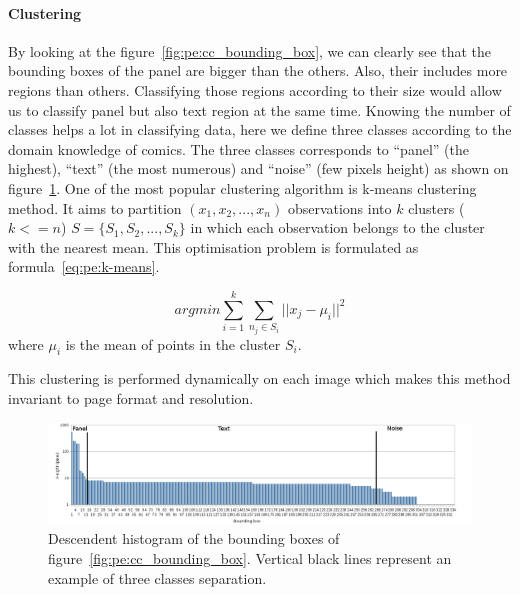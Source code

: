 \paragraph{Clustering} %
\label{par:clustering}
By looking at the figure~\ref{fig:pe:cc_bounding_box}, we can clearly see that the bounding boxes of the panel are bigger than the others.
Also, their includes more regions than others.
Classifying those regions according to their size would allow us to classify panel but also text region at the same time.
Knowing the number of classes helps a lot in classifying data, here 
we define three classes according to the domain knowledge of comics.
The three classes corresponds to ``panel'' (the highest), ``text'' (the most numerous) and ``noise'' (few pixels height) as shown on figure~\ref{fig:pe:histo_roi}.
One of the most popular clustering algorithm is k-means clustering method.
It aims to partition $(x_1, x_2, ...,x_n)$ observations into $k$ clusters ($k <= n$) $S=\{S_1, S_2, ..., S_k\}$ in which each observation belongs to the cluster with the nearest mean.
This optimisation problem is formulated as formula~\ref{eq:pe:k-means}.

\begin{equation}
	arg min \sum\limits_{i=1}^k \sum\limits_{n_j \in S_i} ||x_j - \mu_i||^2
	\label{eq:pe:k-means}
\end{equation}
where $\mu_i$ is the mean of points in the cluster $S_i$.

This clustering is performed dynamically on each image which makes this method invariant to page format and resolution.

	\begin{figure}[!ht]	%
	  \centering
		\includegraphics[height=27mm]{Histogram_en.png}
		\caption{Descendent histogram of the bounding boxes of figure~\ref{fig:pe:cc_bounding_box}. Vertical black lines represent an example of three classes separation.}
		\label{fig:pe:histo_roi}
	\end{figure}

